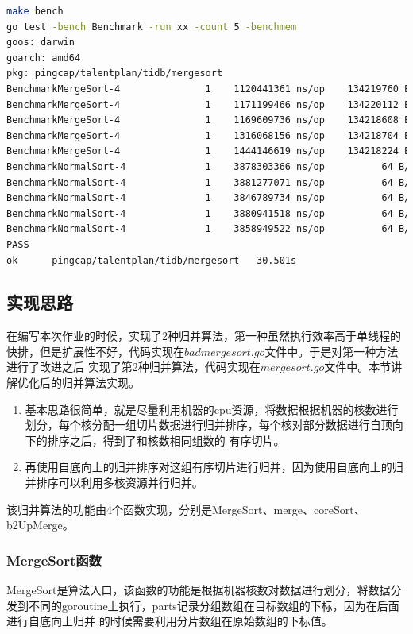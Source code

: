 \documentclass[UTF8]{ctexart}
\begin{document}
\begin{lstlisting}[language=bash]
make bench                                                                                           
go test -bench Benchmark -run xx -count 5 -benchmem
goos: darwin
goarch: amd64
pkg: pingcap/talentplan/tidb/mergesort
BenchmarkMergeSort-4    	       1	1120441361 ns/op	134219760 B/op	      10 allocs/op
BenchmarkMergeSort-4    	       1	1171199466 ns/op	134220112 B/op	      12 allocs/op
BenchmarkMergeSort-4    	       1	1169609736 ns/op	134218608 B/op	       7 allocs/op
BenchmarkMergeSort-4    	       1	1316068156 ns/op	134218704 B/op	       8 allocs/op
BenchmarkMergeSort-4    	       1	1444146619 ns/op	134218224 B/op	       6 allocs/op
BenchmarkNormalSort-4   	       1	3878303366 ns/op	      64 B/op	       2 allocs/op
BenchmarkNormalSort-4   	       1	3881277071 ns/op	      64 B/op	       2 allocs/op
BenchmarkNormalSort-4   	       1	3846789734 ns/op	      64 B/op	       2 allocs/op
BenchmarkNormalSort-4   	       1	3880941518 ns/op	      64 B/op	       2 allocs/op
BenchmarkNormalSort-4   	       1	3858949522 ns/op	      64 B/op	       2 allocs/op
PASS
ok  	pingcap/talentplan/tidb/mergesort	30.501s
\end{lstlisting}

\subsection{实现思路}
在编写本次作业的时候，实现了2种归并算法，第一种虽然执行效率高于单线程的快排，但是扩展性不好，代码实现在$badmergesort.go$文件中。于是对第一种方法进行了改进之后
实现了第2种归并算法，代码实现在$mergesort.go$文件中。本节讲解优化后的归并算法实现。

\begin{enumerate}
  \item 基本思路很简单，就是尽量利用机器的cpu资源，将数据根据机器的核数进行划分，每个核分配一组切片数据进行归并排序，每个核对部分数据进行自顶向下的排序之后，得到了和核数相同组数的
  有序切片。
  \item 再使用自底向上的归并排序对这组有序切片进行归并，因为使用自底向上的归并排序可以利用多核资源并行归并。
\end{enumerate}
该归并算法的功能由4个函数实现，分别是MergeSort、merge、coreSort、b2UpMerge。
\subsubsection{MergeSort函数}

MergeSort是算法入口，该函数的功能是根据机器核数对数据进行划分，将数据分发到不同的goroutine上执行，parts记录分组数组在目标数组的下标，因为在后面进行自底向上归并
的时候需要利用分片数组在原始数组的下标值。
\end{document}
